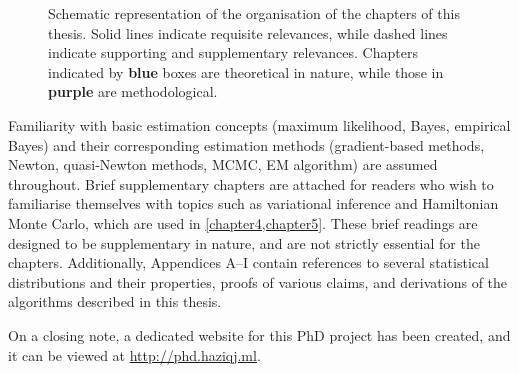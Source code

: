 \documentclass[11pt,twoside,openright,showframe]{report}
\begin{document}
\begin{figure}[hbtp]
  \caption[Schematic representation of the organisation of the chapters of this thesis]{Schematic representation of the organisation of the chapters of this thesis. Solid lines indicate requisite relevances, while dashed lines indicate supporting and supplementary relevances. Chapters indicated by \textbf{\color{lseblu} blue} boxes are theoretical in nature, while those in \textbf{\color{lsedpr} purple} are methodological.}
\end{figure}

Familiarity with basic estimation concepts (maximum likelihood, Bayes, empirical Bayes) and their corresponding estimation methods (gradient-based methods, Newton, quasi-Newton methods, MCMC, EM algorithm) are assumed throughout.
Brief supplementary chapters are attached for readers who wish to familiarise themselves with topics such as variational inference and Hamiltonian Monte Carlo, which are used in \cref{chapter4,chapter5}.
These brief readings are designed to be supplementary in nature, and are not strictly essential for the chapters.
Additionally, Appendices A--I contain references to several statistical distributions and their properties, proofs of various claims, and derivations of the algorithms described in this thesis.

On a closing note, a dedicated website for this PhD project has been created, and it can be viewed at \url{http://phd.haziqj.ml}.

\hClosingStuffStandalone
\end{document}
